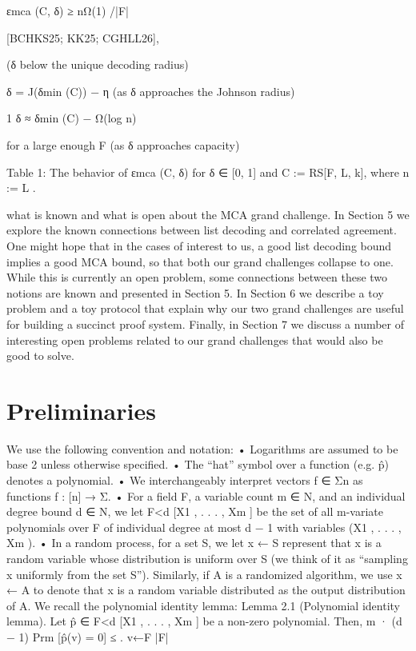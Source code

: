 \documentclass[11pt]{article}
\begin{document}
εmca (C, δ) ≥ nΩ(1) /|F|

[BCHKS25; KK25; CGHLL26],

(δ below the unique decoding radius)

δ = J(δmin (C)) − η
(as δ approaches the Johnson radius)

1
δ ≈ δmin (C) − Ω(log
n)

for a large enough F
(as δ approaches capacity)

Table 1: The behavior of εmca (C, δ) for δ ∈ [0, 1] and C := RS[F, L, k], where n := L .

what is known and what is open about the MCA grand challenge. In Section 5 we explore the known
connections between list decoding and correlated agreement. One might hope that in the cases of
interest to us, a good list decoding bound implies a good MCA bound, so that both our grand
challenges collapse to one. While this is currently an open problem, some connections between
these two notions are known and presented in Section 5. In Section 6 we describe a toy problem
and a toy protocol that explain why our two grand challenges are useful for building a succinct
proof system. Finally, in Section 7 we discuss a number of interesting open problems related to our
grand challenges that would also be good to solve.


\section{Preliminaries}



We use the following convention and notation:
• Logarithms are assumed to be base 2 unless otherwise specified.
• The “hat” symbol over a function (e.g. p̂) denotes a polynomial.
• We interchangeably interpret vectors f ∈ Σn as functions f : [n] → Σ.
• For a field F, a variable count m ∈ N, and an individual degree bound d ∈ N, we let F<d [X1 , . . . , Xm ]
be the set of all m-variate polynomials over F of individual degree at most d − 1 with variables
(X1 , . . . , Xm ).
• In a random process, for a set S, we let x ← S represent that x is a random variable whose
distribution is uniform over S (we think of it as “sampling x uniformly from the set S”). Similarly,
if A is a randomized algorithm, we use x ← A to denote that x is a random variable distributed
as the output distribution of A.
We recall the polynomial identity lemma:
Lemma 2.1 (Polynomial identity lemma). Let p̂ ∈ F<d [X1 , . . . , Xm ] be a non-zero polynomial.
Then,
m · (d − 1)
Prm [p̂(v) = 0] ≤
.
v←F
|F|
\end{document}
